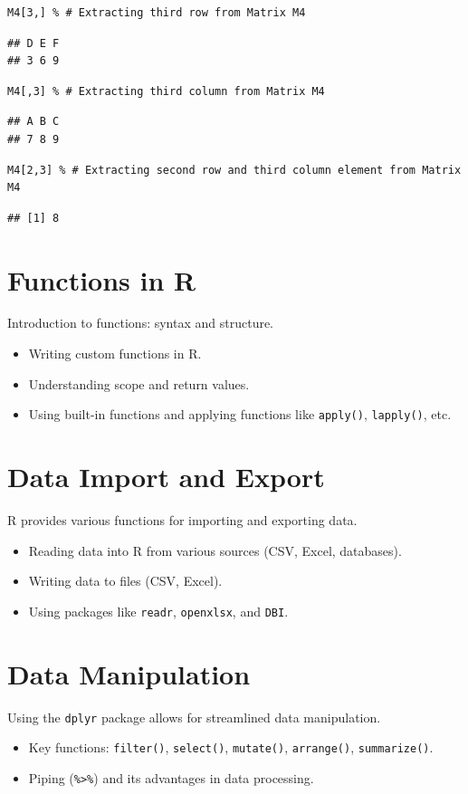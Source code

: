 \documentclass[12pt]{book}
\begin{document}
\begin{verbatim}
M4[3,] % # Extracting third row from Matrix M4
\end{verbatim}
\begin{verbatim}
## D E F 
## 3 6 9
\end{verbatim}
\begin{verbatim}
M4[,3] % # Extracting third column from Matrix M4
\end{verbatim}
\begin{verbatim}
## A B C 
## 7 8 9
\end{verbatim}
\begin{verbatim}
M4[2,3] % # Extracting second row and third column element from Matrix M4
\end{verbatim}
\begin{verbatim}
## [1] 8
\end{verbatim}










\section{Functions in R}
Introduction to functions: syntax and structure.
\begin{itemize}
    \item Writing custom functions in R.
    \item Understanding scope and return values.
    \item Using built-in functions and applying functions like \texttt{apply()}, \texttt{lapply()}, etc.
\end{itemize}

\section{Data Import and Export}
R provides various functions for importing and exporting data.
\begin{itemize}
    \item Reading data into R from various sources (CSV, Excel, databases).
    \item Writing data to files (CSV, Excel).
    \item Using packages like \texttt{readr}, \texttt{openxlsx}, and \texttt{DBI}.
\end{itemize}

\section{Data Manipulation}
Using the \texttt{dplyr} package allows for streamlined data manipulation.
\begin{itemize}
    \item Key functions: \texttt{filter()}, \texttt{select()}, \texttt{mutate()}, \texttt{arrange()}, \texttt{summarize()}.
    \item Piping (\texttt{\%>\%}) and its advantages in data processing.
\end{itemize}
\end{document}
